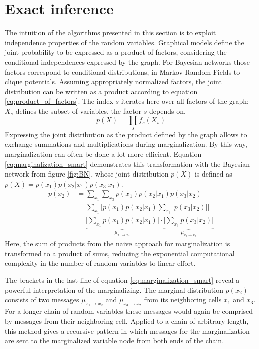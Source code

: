 \documentclass{sigkdd}
\begin{document}
\section{Exact inference}
The intuition of the algorithms presented in this section is to exploit independence properties of the random variables. Graphical models define the joint probability to be expressed as a product of factors, considering the conditional independences expressed by the graph. For Bayesian networks those factors correspond to conditional distributions, in Markov Random Fields to clique potentials. Assuming appropriately normalized factors, the joint distribution can be written as a product according to equation \ref{eq:product_of_factors}. The index $s$ iterates here over all factors of the graph; $X_s$ defines the subset of variables, the factor $s$ depends on.
\begin{equation}\label{eq:product_of_factors}
p(X)= \prod_{s} f_s(X_s)
\end{equation}
Expressing the joint distribution as the product defined by the graph allows to exchange summations and multiplications during marginalization. By this way, marginalization can often be done a lot more efficient. Equation \ref{eq:marginalization_smart} demonstrates this transformation with the Bayesian network from figure \ref{fig:BN}, whose joint distribution $p(X)$ is defined as $p(X) =  p(x_1) p(x_2|x_1) p(x_3|x_1)$.
\begin{equation}\label{eq:marginalization_smart}
\begin{split}
p(x_2) &= \sum_{x_1} \sum_{x_3} p(x_1) p(x_2|x_1) p(x_3|x_2) \\ &= \sum_{x_1} \Big[  p(x_1) p(x_2|x_1) \sum_{x_3} \Big[ p(x_3|x_2)\Big] \Big] \\ &= \underbrace{\Big[ \sum_{x_1}  p(x_1) p(x_2|x_1)\Big]}_{\mu_{x_1 \rightarrow x_2}}\cdot \underbrace{\Big[ \sum_{x_3}  p(x_3|x_2)\Big]}_{\mu_{x_3 \rightarrow x_2}}
\end{split}
\end{equation}
Here, the sum of products from the naive approach for marginalization is transformed to a product of sums, reducing the exponential computational complexity in the number of random variables to linear effort.

The brackets in the last line of equation \ref{eq:marginalization_smart} reveal a powerful interpretation of the marginalizing. The marginal distribution $p(x_2)$ consists of two messages $\mu_{x_1 \rightarrow x_2}$ and $\mu_{x_3 \rightarrow x_2}$ from its neighboring cells $x_1$ and $x_3$. For a longer chain of random variables these messages would again be comprised by messages from their neighboring cell. Applied to a chain of arbitrary length, this method gives a recursive pattern in which messages for the marginalization are sent to the marginalized variable node from both ends of the chain.  
\end{document}
